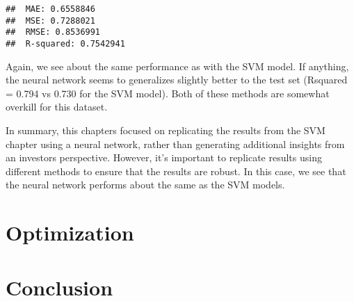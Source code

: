 \documentclass[
]{article}
\newenvironment{Shaded}{\begin{snugshade}}{\end{snugshade}}
\newcommand{\DecValTok}[1]{\textcolor[rgb]{0.00,0.00,0.81}{#1}}
\newcommand{\FunctionTok}[1]{\textcolor[rgb]{0.13,0.29,0.53}{\textbf{#1}}}
\newcommand{\NormalTok}[1]{#1}
\newcommand{\OtherTok}[1]{\textcolor[rgb]{0.56,0.35,0.01}{#1}}
\newcommand{\SpecialCharTok}[1]{\textcolor[rgb]{0.81,0.36,0.00}{\textbf{#1}}}
\newcommand{\StringTok}[1]{\textcolor[rgb]{0.31,0.60,0.02}{#1}}
\begin{document}
\begin{Shaded}
\end{Shaded}

\begin{verbatim}
##  MAE: 0.6558846 
##  MSE: 0.7288021 
##  RMSE: 0.8536991 
##  R-squared: 0.7542941
\end{verbatim}

Again, we see about the same performance as with the SVM model. If
anything, the neural network seems to generalizes slightly better to the
test set (Rsquared = 0.794 vs 0.730 for the SVM model). Both of these
methods are somewhat overkill for this dataset.

In summary, this chapters focused on replicating the results from the
SVM chapter using a neural network, rather than generating additional
insights from an investors perspective. However, it's important to
replicate results using different methods to ensure that the results are
robust. In this case, we see that the neural network performs about the
same as the SVM models.

\hypertarget{optimization}{%
\section{Optimization}\label{optimization}}

\hypertarget{conclusion}{%
\section{Conclusion}\label{conclusion}}
\end{document}
